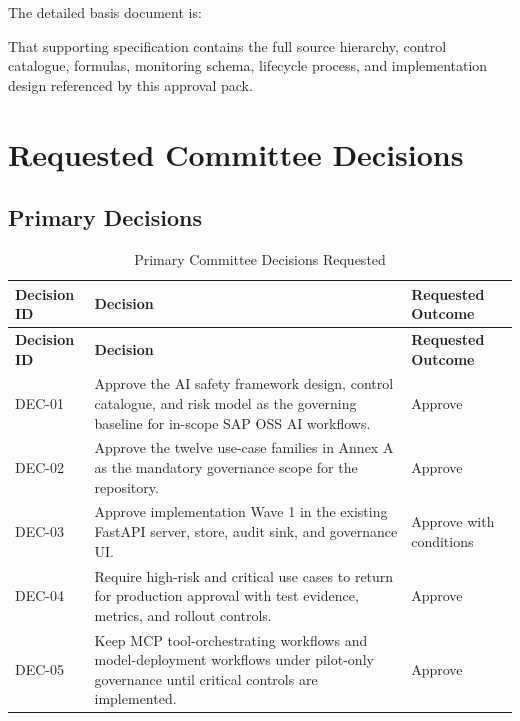 \documentclass[11pt,a4paper]{article}
\begin{document}
The detailed basis document is:

\begin{quote}
\end{quote}

That supporting specification contains the full source hierarchy, control catalogue, formulas, monitoring schema, lifecycle process, and implementation design referenced by this approval pack.

\section{Requested Committee Decisions}

\subsection{Primary Decisions}

\begin{longtable}{P{0.12\textwidth}P{0.53\textwidth}P{0.20\textwidth}}
\caption{Primary Committee Decisions Requested} \\
\toprule
\textbf{Decision ID} & \textbf{Decision} & \textbf{Requested Outcome} \\
\midrule
\endfirsthead
\toprule
\textbf{Decision ID} & \textbf{Decision} & \textbf{Requested Outcome} \\
\midrule
\endhead
DEC-01 & Approve the AI safety framework design, control catalogue, and risk model as the governing baseline for in-scope SAP OSS AI workflows. & Approve \\
DEC-02 & Approve the twelve use-case families in Annex A as the mandatory governance scope for the repository. & Approve \\
DEC-03 & Approve implementation Wave 1 in the existing FastAPI server, store, audit sink, and governance UI. & Approve with conditions \\
DEC-04 & Require high-risk and critical use cases to return for production approval with test evidence, metrics, and rollout controls. & Approve \\
DEC-05 & Keep MCP tool-orchestrating workflows and model-deployment workflows under pilot-only governance until critical controls are implemented. & Approve \\
\bottomrule
\end{longtable}
\end{document}
